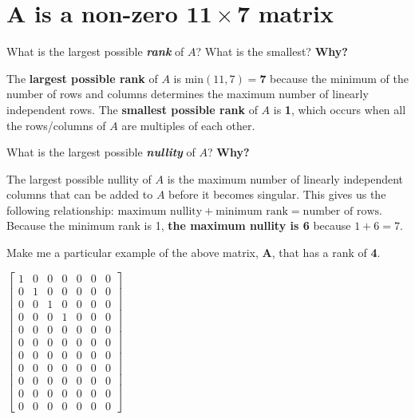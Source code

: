 \documentclass[
  letterpaper,
  DIV=11,
  numbers=noendperiod]{scrartcl}
\begin{document}
\newpage{}

\hypertarget{symbfa-is-a-non-zero-symbf11-times-7-matrix}{%
\section{\texorpdfstring{\(\symbf{A}\) is a non-zero
\(\symbf{11 \times 7}\)
matrix}{\textbackslash symbf\{A\} is a non-zero \textbackslash symbf\{11 \textbackslash times 7\} matrix}}\label{symbfa-is-a-non-zero-symbf11-times-7-matrix}}

What is the largest possible \textbf{\emph{rank}} of \(A\)? What is the
smallest? \textbf{Why?}

The \textbf{largest possible rank} of \(A\) is
\(\mathrm{min}⁡(11,7) = \symbf{7}\) because the minimum of the number of
rows and columns determines the maximum number of linearly independent
rows. The \textbf{smallest possible rank} of \(A\) is \textbf{1}, which
occurs when all the rows/columns of \(A\) are multiples of each other.

What is the largest possible \textbf{\emph{nullity}} of \(A\)?
\textbf{Why?}

The largest possible nullity of \(A\) is the maximum number of linearly
independent columns that can be added to \(A\) before it becomes
singular. This gives us the following relationship:
\(\text{maximum nullity}+\text{minimum rank}=\text{number of rows}\).
Because the minimum rank is 1, \textbf{the maximum nullity is 6} because
\(1+6=7\).

\newpage{}

Make me a particular example of the above matrix, \(\symbf{A}\), that
has a rank of \textbf{4}.

\(\begin{bmatrix} 1 & 0 & 0 & 0 & 0 & 0 & 0\\ 0 & 1 & 0 & 0 & 0 & 0 & 0 \\ 0 & 0 & 1 & 0 & 0 & 0 & 0 \\ 0 & 0 & 0 & 1 & 0 & 0 & 0 \\ 0 & 0 & 0 & 0 & 0 & 0 & 0 \\ 0 & 0 & 0 & 0 & 0 & 0 & 0 \\ 0 & 0 & 0 & 0 & 0 & 0 & 0 \\ 0 & 0 & 0 & 0 & 0 & 0 & 0 \\ 0 & 0 & 0 & 0 & 0 & 0 & 0 \\ 0 & 0 & 0 & 0 & 0 & 0 & 0 \\ 0 & 0 & 0 & 0 & 0 & 0 & 0 \end{bmatrix}\)
\end{document}
